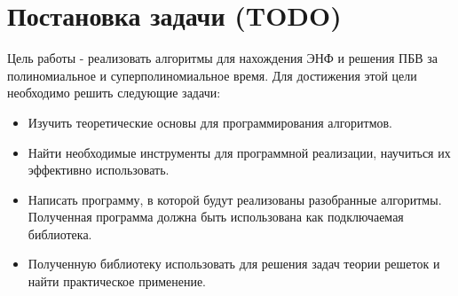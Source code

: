 \newpage

\section{Постановка задачи (TODO)}

Цель работы - реализовать алгоритмы для нахождения ЭНФ и решения ПБВ за полиномиальное и суперполиномиальное время. Для достижения этой цели необходимо решить следующие задачи:
\begin{itemize}
\item Изучить теоретические основы для программирования алгоритмов.
\item Найти необходимые инструменты для программной реализации, научиться их эффективно использовать.
\item Написать программу, в которой будут реализованы разобранные алгоритмы. Полученная программа должна быть использована как подключаемая библиотека.
\item Полученную библиотеку использовать для решения задач теории решеток и найти практическое применение.
\end{itemize}  

\clearpage